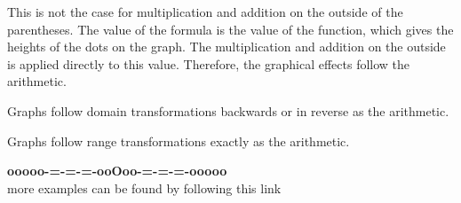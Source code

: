 \documentclass{ximera}
\begin{document}
This is not the case for multiplication and addition on the outside of the parentheses.  The value of the formula is the value of the function, which gives the heights of the dots on the graph.  The multiplication and addition on the outside is applied directly to this value.  Therefore, the graphical effects follow the arithmetic.


\begin{center}

Graphs follow domain transformations backwards or in reverse as the arithmetic.


\end{center}


\begin{center}

Graphs follow range transformations exactly as the arithmetic.


\end{center}













\begin{center}
\textbf{\textcolor{green!50!black}{ooooo-=-=-=-ooOoo-=-=-=-ooooo}} \\

more examples can be found by following this link\\ 

\end{center}
\end{document}
